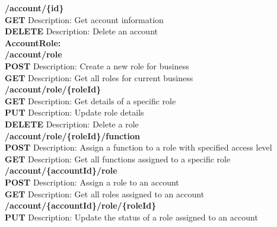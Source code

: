 \documentclass[11pt,a4paper,pdftex]{article}
\begin{document}
\hspace*{1em}\textbf{/account/\{id\}}\\
\hspace*{2em}\textbf{GET} Description: Get account information\\
\hspace*{2em}\textbf{DELETE} Description: Delete an account\\


\textbf{AccountRole:}\\
\hspace*{1em}\textbf{/account/role}\\
\hspace*{2em}\textbf{POST} Description: Create a new role for business\\
\hspace*{2em}\textbf{GET} Description: Get all roles for current business\\

\hspace*{1em}\textbf{/account/role/\{roleId\}}\\
\hspace*{2em}\textbf{GET} Description: Get details of a specific role\\
\hspace*{2em}\textbf{PUT} Description: Update role details\\
\hspace*{2em}\textbf{DELETE} Description: Delete a role\\

\hspace*{1em}\textbf{/account/role/\{roleId\}/function}\\
\hspace*{2em}\textbf{POST} Description: Assign a function to a role with specified access level\\
\hspace*{2em}\textbf{GET} Description: Get all functions assigned to a specific role\\

\hspace*{1em}\textbf{/account/\{accountId\}/role}\\
\hspace*{2em}\textbf{POST} Description: Assign a role to an account\\
\hspace*{2em}\textbf{GET} Description: Get all roles assigned to an account\\

\hspace*{1em}\textbf{/account/\{accountId\}/role/\{roleId\}}\\
\hspace*{2em}\textbf{PUT} Description: Update the status of a role assigned to an account\\
\end{document}
